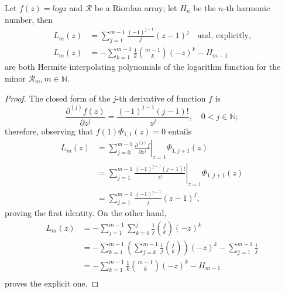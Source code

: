 
\begin{theorem}
\label{thm:log-Hermite-interpolating-poly-implicit}
Let $f(z)=log{z}$ and $\mathcal{R}$ be a Riordan array; let $H_{n}$ be the
$n$-th harmonic number, then 
\begin{equation}
  \label{eq:log-Hermite-interpolating-poly}
  \begin{split}
  L_{m}(z) &= \sum_{j=1}^{m-1}{\frac{(-1)^{j-1}}{j}{\left(z-1\right)^{j} }}
  \quad\text{and, explicitly,}\\
  L_{m}(z) &= - \sum_{k=1}^{m-1}\frac{1}{k}{{m-1}\choose{k}}{(-z)^{k}}- H_{m-1} 
  \end{split}
\end{equation}
are both Hermite interpolating polynomials of the logarithm function for the minor
$\mathcal{R}_{m}, m\in\mathbb{N}$.
\end{theorem}

\begin{proof}
The closed form of the $j$-th derivative of function $f$ is 
$$\frac{\partial^{(j)}{f}(z)}{\partial{z}^{j}} =\frac{(-1)^{j-1}(j-1)!}{z^{j}}, \quad 0<j\in\mathbb{N};$$ 
therefore, observing that $f(1)\Phi_{1,1}(z)=0$ entails
\begin{displaymath}
\begin{split}
  L_{m}(z)  &= \sum_{j=0}^{m-1}{ \left. \frac{\partial^{(j)}{f}}{\partial{z}^{j}} \right|_{z=1}\Phi_{1,j+1}(z)}\\
            &= \sum_{j=1}^{m-1}{ \left. \frac{(-1)^{j-1}(j-1)!}{z^{j}} \right|_{z=1}\Phi_{1,j+1}(z)}\\
            &= \sum_{j=1}^{m-1}{ \frac{(-1)^{j-1}}{j} (z-1)^{j}},
\end{split}
\end{displaymath}
proving the first identity. On the other hand,
\begin{displaymath}
\begin{split}
  L_{m}(z)  &= - \sum_{j=1}^{m-1}{\sum_{k=0}^{j}{\frac{1}{j}{{j}\choose{k}}(-z)^{k}}}\\
            &= - \sum_{k=1}^{m-1}{\left(\sum_{j=k}^{m-1}{\frac{1}{j}{{j}\choose{k}}}\right)}(-z)^{k} - \sum_{j=1}^{m-1}{\frac{1}{j}}\\
            &= - \sum_{k=1}^{m-1}\frac{1}{k}{{m-1}\choose{k}}{(-z)^{k}}- H_{m-1} \\
\end{split}
\end{displaymath}
proves the explicit one.
\end{proof}

